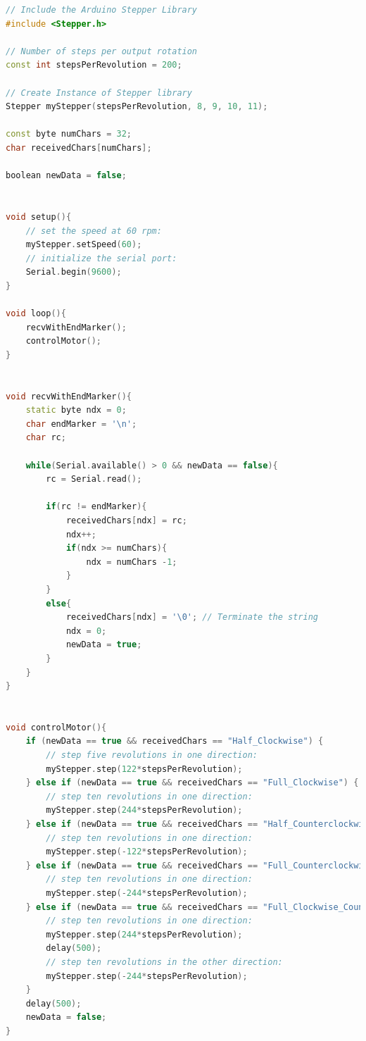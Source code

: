 \documentclass[transmag]{IEEEtran}
\begin{document}
\begin{lstlisting}[language=C++, caption=Micro-controller - Motor Control]
// Include the Arduino Stepper Library
#include <Stepper.h>

// Number of steps per output rotation
const int stepsPerRevolution = 200;

// Create Instance of Stepper library
Stepper myStepper(stepsPerRevolution, 8, 9, 10, 11);

const byte numChars = 32;
char receivedChars[numChars];

boolean newData = false;


void setup(){
    // set the speed at 60 rpm:
    myStepper.setSpeed(60);
    // initialize the serial port:
    Serial.begin(9600);
}

void loop(){
    recvWithEndMarker();
    controlMotor();
}


void recvWithEndMarker(){
    static byte ndx = 0;
    char endMarker = '\n';
    char rc;

    while(Serial.available() > 0 && newData == false){
        rc = Serial.read();

        if(rc != endMarker){
            receivedChars[ndx] = rc;
            ndx++;
            if(ndx >= numChars){
                ndx = numChars -1;
            }
        }
        else{
            receivedChars[ndx] = '\0'; // Terminate the string
            ndx = 0;
            newData = true;
        }
    }   
}


void controlMotor(){
    if (newData == true && receivedChars == "Half_Clockwise") {
        // step five revolutions in one direction:
        myStepper.step(122*stepsPerRevolution);
    } else if (newData == true && receivedChars == "Full_Clockwise") {
        // step ten revolutions in one direction:
        myStepper.step(244*stepsPerRevolution);
    } else if (newData == true && receivedChars == "Half_Counterclockwise") {
        // step ten revolutions in one direction:
        myStepper.step(-122*stepsPerRevolution);
    } else if (newData == true && receivedChars == "Full_Counterclockwise") {
        // step ten revolutions in one direction:
        myStepper.step(-244*stepsPerRevolution);
    } else if (newData == true && receivedChars == "Full_Clockwise_Counterclockwise") {
        // step ten revolutions in one direction:
        myStepper.step(244*stepsPerRevolution);
        delay(500);
        // step ten revolutions in the other direction:
        myStepper.step(-244*stepsPerRevolution);
    }    
    delay(500);          
    newData = false;
}

\end{lstlisting}
\end{document}
